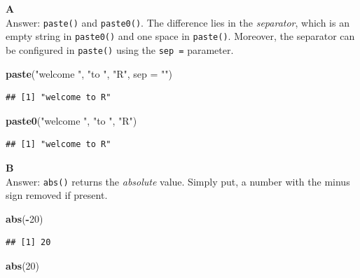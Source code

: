 \documentclass[]{book}
\newenvironment{Shaded}{\begin{snugshade}}{\end{snugshade}}
\newcommand{\DataTypeTok}[1]{\textcolor[rgb]{0.13,0.29,0.53}{#1}}
\newcommand{\DecValTok}[1]{\textcolor[rgb]{0.00,0.00,0.81}{#1}}
\newcommand{\KeywordTok}[1]{\textcolor[rgb]{0.13,0.29,0.53}{\textbf{#1}}}
\newcommand{\NormalTok}[1]{#1}
\newcommand{\OperatorTok}[1]{\textcolor[rgb]{0.81,0.36,0.00}{\textbf{#1}}}
\newcommand{\StringTok}[1]{\textcolor[rgb]{0.31,0.60,0.02}{#1}}
\begin{document}
\textbf{A}\\
Answer: \texttt{paste()} and \texttt{paste0()}. The difference lies in the \emph{separator}, which is an empty string in \texttt{paste0()} and one space in \texttt{paste()}. Moreover, the separator can be configured in \texttt{paste()} using the \texttt{sep\ =} parameter.

\begin{Shaded}
\begin{Highlighting}[]
\KeywordTok{paste}\NormalTok{(}\StringTok{"welcome "}\NormalTok{, }\StringTok{"to "}\NormalTok{, }\StringTok{"R"}\NormalTok{, }\DataTypeTok{sep =} \StringTok{""}\NormalTok{)}
\end{Highlighting}
\end{Shaded}

\begin{verbatim}
## [1] "welcome to R"
\end{verbatim}

\begin{Shaded}
\begin{Highlighting}[]
\KeywordTok{paste0}\NormalTok{(}\StringTok{"welcome "}\NormalTok{, }\StringTok{"to "}\NormalTok{, }\StringTok{"R"}\NormalTok{)}
\end{Highlighting}
\end{Shaded}

\begin{verbatim}
## [1] "welcome to R"
\end{verbatim}

\textbf{B}\\
Answer: \texttt{abs()} returns the \emph{absolute} value. Simply put, a number with the minus sign removed if present.

\begin{Shaded}
\begin{Highlighting}[]
\KeywordTok{abs}\NormalTok{(}\OperatorTok{-}\DecValTok{20}\NormalTok{)}
\end{Highlighting}
\end{Shaded}

\begin{verbatim}
## [1] 20
\end{verbatim}

\begin{Shaded}
\begin{Highlighting}[]
\KeywordTok{abs}\NormalTok{(}\DecValTok{20}\NormalTok{)}
\end{Highlighting}
\end{Shaded}
\end{document}
